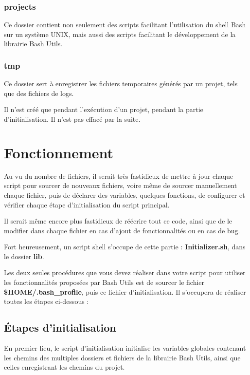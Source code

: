 \documentclass[a4paper,10pt]{article}
\begin{document}
\color{blue}
\subsubsection{projects}\color{white}
Ce dossier contient non seulement des scripts facilitant l'utilisation du shell Bash sur un système UNIX, mais aussi des scripts facilitant le développement de la librairie Bash Utils.

\color{blue}
\subsubsection{tmp}\color{white}
Ce dossier sert à enregistrer les fichiers temporaires générés par un projet, tels que des fichiers de logs.

Il n'est créé que pendant l'exécution d'un projet, pendant la partie d'initialisation. Il n'est pas effacé par la suite.


\color{red}
\section{Fonctionnement}\color{white}
Au vu du nombre de fichiers, il serait très fastidieux de mettre à jour chaque script pour sourcer de nouveaux fichiers, voire même de sourcer manuellement chaque fichier, puis de déclarer des variables, quelques fonctions, de configurer et vérifier chaque étape d'initialisation du script principal.

Il serait même encore plus fastidieux de réécrire tout ce code, ainsi que de le modifier dans chaque fichier en cas d'ajout de fonctionnalités ou en cas de bug.

Fort heureusement, un script shell s'occupe de cette partie : \color{lime}\textbf{Initializer.sh}\color{white}, dans le dossier \color{lime}\textbf{lib}\color{white}.

Les deux seules procédures que vous devez réaliser dans votre script pour utiliser les fonctionnalités proposées par Bash Utils est de sourcer le fichier \color{orange}\textbf{\$HOME\color{lime}/.bash\_profile}\color{white}, puis ce fichier d'initialisation. Il s'occupera de réaliser toutes les étapes ci-dessous :

\color{green}
\subsection{Étapes d'initialisation}\color{white}
En premier lieu, le script d'initialisation initialise les variables globales contenant les chemins des multiples dossiers et fichiers de la librairie Bash Utils, ainsi que celles enregistrant les chemins du projet.
\end{document}

